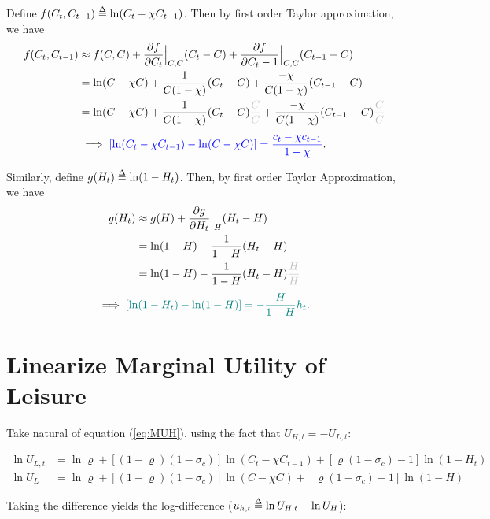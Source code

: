 \documentclass[]{article}
\begin{document}
Define $f(C_t,C_{t-1}) \delequal \ln (C_t-\chi C_{t-1})$. Then by first order Taylor approximation, we have
\begin{align*}
	f(C_t, C_{t-1}) &\approx f(C,C) + \frac{\partial f}{\partial C_t}\Bigr|_{\substack{C,C}} (C_t-C) +  \frac{\partial f}{\partial C_{t}-1}\Bigr|_{\substack{C,C}} (C_{t-1}-C) \\
	&=\ln(C-\chi C) + \frac{1}{C(1-\chi)}(C_t-C) + \frac{-\chi}{C(1-\chi)} (C_{t-1}-C)\\
	&=\ln(C-\chi C) + \frac{1}{C(1-\chi)}(C_t-C){\color{lightgray}\frac{C}{C}} + \frac{-\chi}{C(1-\chi)} (C_{t-1}-C){\color{lightgray}\frac{C}{C}}\\
\end{align*}
\[ \implies {\color{blue}[\ln(C_t-\chi C_{t-1}) -  \ln(C-\chi C)] = \frac{c_t-\chi c_{t-1}}{1-\chi}}. \]

Similarly, define $g(H_t)\delequal\ln(1-H_t)$. Then, by first order Taylor Approximation, we have
\begin{align*}
	g(H_t) &\approx g(H) + \frac{\partial g}{\partial H_t}\Bigr|_{\substack{H}} (H_t-H) \\
	&=\ln(1-H) - \frac{1}{1-H}(H_t-H)\\
	&=\ln(1-H) - \frac{1}{1-H}(H_t-H) {\color{lightgray}\frac{H}{H}}\\
\end{align*}
\[ \implies {\color{teal}[\ln(1-H_t) -  \ln(1-H)] = -\frac{H}{1-H}h_t}.\]

\begin{center}
\end{center}


\section{Linearize Marginal Utility of Leisure}

Take natural of equation (\ref{eq:MUH}), using the fact that $U_{H,t}=-U_{L,t}$:

\begin{align*}
	\ln U_{L,t} &= \ln \varrho + [(1-\varrho)(1-\sigma_c)]\ln(C_t-\chi C_{t-1}) + [\varrho (1-\sigma_c)-1]\ln (1-H_t)\\
	\ln U_{L} &= \ln \varrho + [(1-\varrho)(1-\sigma_c)] \ln(C-\chi C_{}) + [\varrho (1-\sigma_c)-1]\ln(1-H)
\end{align*}

\noindent Taking the difference yields the log-difference ($u_{h,t} \delequal \ln U_{H,t} - \ln U_{H}$):
\end{document}
